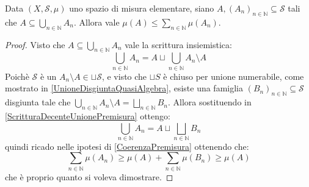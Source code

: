 \begin{lemma}\label{PiuCheMonotonaPremisura}
	Data $(X,\mathcal S,\mu)$ uno spazio di misura elementare, siano $A,(A_n)_{n\in\mathbb N}\subseteq \mathcal S$ tali che $A\subseteq\bigcup_{n\in\mathbb N}A_n$.
	Allora vale $\mu(A)\le \sum_{n\in\mathbb N}\mu(A_n)$.
\end{lemma}
\begin{proof}
	Visto che $A\subseteq\bigcup_{n\in\mathbb N}A_n$ vale la scrittura insiemistica:
	\begin{equation}\label{ScritturaDecenteUnionePremisura}
		\bigcup_{n\in\mathbb N}A_n=A\sqcup\bigcup_{n\in\mathbb N}A_n\setminus A
	\end{equation}
	Poichè $\mathcal S$ è un \semiring{} $A_n\setminus A\in \sqcup \mathcal S$, e visto che $\sqcup S$ è chiuso per unione numerabile, come mostrato in \cref{UnioneDisgiuntaQuasiAlgebra}, esiste una famiglia $(B_n)_{n\in\mathbb N}\subseteq\mathcal S$ disgiunta tale che $\bigcup_{n\in\mathbb N}A_n\setminus A=\bigsqcup_{n\in\mathbb N}B_n$.
	Allora sostituendo in \cref{ScritturaDecenteUnionePremisura} ottengo:
	\begin{equation*}
		\bigcup_{n\in\mathbb N}A_n=A\sqcup\bigsqcup_{n\in\mathbb N}B_n
	\end{equation*}
	quindi ricado nelle ipotesi di \cref{CoerenzaPremisura} ottenendo che:
	\begin{equation*}
		\sum_{n\in\mathbb N}\mu(A_n)\ge \mu(A)+\sum_{n\in\mathbb N}\mu(B_n)\ge \mu(A)
	\end{equation*}
	che è proprio quanto si voleva dimostrare.

\end{proof}



